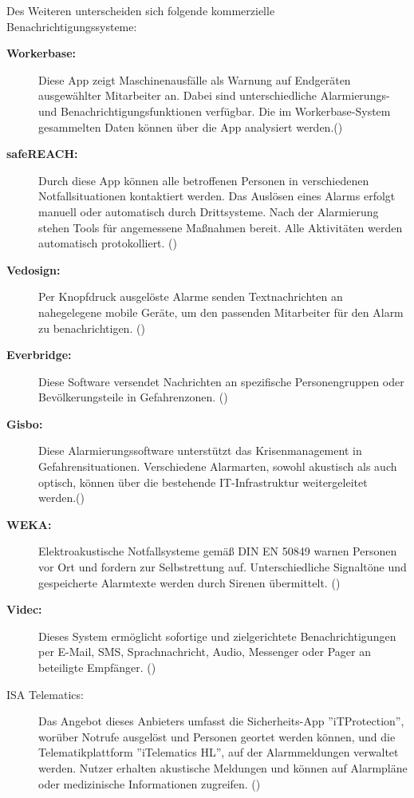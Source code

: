 Des Weiteren unterscheiden sich folgende kommerzielle Benachrichtigungssysteme:

\begin{description}
   \item [\textbf{Workerbase:}] Diese App zeigt Maschinenausfälle als Warnung auf Endgeräten ausgewählter Mitarbeiter an. Dabei sind unterschiedliche Alarmierungs- und Benachrichtigungsfunktionen verfügbar. Die im Workerbase-System gesammelten Daten können über die App analysiert werden.(\cite{Workerbase})
   
   \item [\textbf{safeREACH:}] Durch diese App können alle betroffenen Personen in verschiedenen Notfallsituationen kontaktiert werden. Das Auslösen eines Alarms erfolgt manuell oder automatisch durch Drittsysteme. Nach der Alarmierung stehen Tools für angemessene Maßnahmen bereit. Alle Aktivitäten werden automatisch protokolliert. (\cite{safeREACH})
   
   \item [\textbf{Vedosign:}] Per Knopfdruck ausgelöste Alarme senden Textnachrichten an nahegelegene mobile Geräte, um den passenden Mitarbeiter für den Alarm zu benachrichtigen. (\cite{vedosign})
   
   \item [\textbf{Everbridge:}] Diese Software versendet Nachrichten an spezifische Personengruppen oder Bevölkerungsteile in Gefahrenzonen. (\cite{everbridge})

   \item [\textbf{Gisbo:}] Diese Alarmierungssoftware unterstützt das Krisenmanagement in Gefahrensituationen. Verschiedene Alarmarten, sowohl akustisch als auch optisch, können über die bestehende IT-Infrastruktur weitergeleitet werden.(\cite{Gisbo})

   \item [\textbf{WEKA:}] Elektroakustische Notfallsysteme gemäß DIN EN 50849 warnen Personen vor Ort und fordern zur Selbstrettung auf. Unterschiedliche Signaltöne und gespeicherte Alarmtexte werden durch Sirenen übermittelt. (\cite{WEKA})
   
   \item [\textbf{Videc:}] Dieses System ermöglicht sofortige und zielgerichtete Benachrichtigungen per E-Mail, SMS, Sprachnachricht, Audio, Messenger oder Pager an beteiligte Empfänger. (\cite{VIDEC})

   \item[ISA Telematics:] Das Angebot dieses Anbieters umfasst die Sicherheits-App ''iTProtection'', worüber Notrufe ausgelöst und Personen geortet werden können, und die Telematikplattform ''iTelematics HL'', auf der Alarmmeldungen verwaltet werden. Nutzer erhalten akustische Meldungen und können auf Alarmpläne oder medizinische Informationen zugreifen. (\cite{ISA_Telematics})

\end{description} \ 

